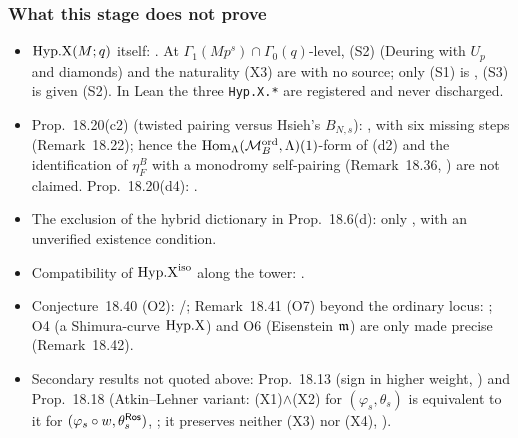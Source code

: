 \subsubsection*{What this stage does not prove}
\begin{itemize}
\item $\mathrm{Hyp.X}(M;q)$ itself: \sthyp. At $\Gamma_1(Mp^s)\cap\Gamma_0(q)$-level, (S2) (Deuring with $U_p$ and diamonds) and the naturality (X3) are
  \stexp{} with no source; only (S1) is \stcited, (S3) is \stpmc{} given (S2). In Lean the three \texttt{Hyp.X.*} are registered and never
  discharged.
\item Prop.~18.20(c2) (twisted pairing versus Hsieh's $B_{N,s}$): \stopen, with six missing steps (Remark~18.22); hence the
  $\operatorname{Hom}_\Lambda(\mathcal{M}^{\mathrm{ord}}_B,\Lambda)(1)$-form of (d2) and the identification of $\eta^B_F$ with a monodromy self-pairing (Remark~18.36, \sttoprove) are
  not claimed. Prop.~18.20(d4): \stsketch.
\item The exclusion of the hybrid dictionary in Prop.~18.6(d): only \stpmc, with an unverified existence condition.
\item Compatibility of $\mathrm{Hyp.X}^{\mathrm{iso}}$ along the tower: \stsketch.
\item Conjecture~18.40 (O2): \stconj/\stopen; Remark~18.41 (O7) beyond the ordinary locus: \stopen; O4 (a Shimura-curve $\mathrm{Hyp.X}$) and O6
  (Eisenstein $\mathfrak{m}$) are only made precise (Remark~18.42).
\item Secondary results not quoted above: Prop.~18.13 (sign in higher weight, \stpmc) and Prop.~18.18 (Atkin--Lehner variant: (X1)$\wedge$(X2)
  for $(\varphi_s,\theta_s)$ is equivalent to it for $(\varphi_s\circ w,\theta_s^{\mathsf{Ros}})$, \stpmc; it preserves neither (X3) nor (X4), \stsketch).
\end{itemize}
